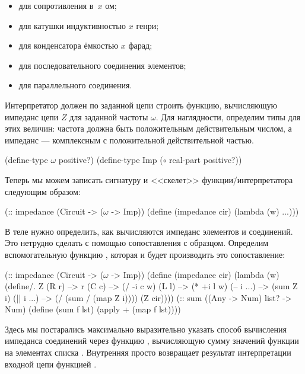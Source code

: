 \begin{itemize}
 \item[]  для сопротивления в~$x$ ом;

 \item[]  для катушки индуктивностью $x$ генри;

 \item[]  для конденсатора ёмкостью $x$ фарад;

 \item[]  для последовательного соединения элементов;

 \item[]  для параллельного соединения.
\end{itemize}

 Интерпретатор должен по заданной цепи строить функцию, вычисляющую импеданс цепи $Z$ для заданной частоты $\omega$. 
Для наглядности, определим типы для этих величин: частота должна быть положительным действительным числом, а импеданс --- комплексным с положительной действительной частью.
\begin{Definition}
 (define-type $\omega$ positive?)
 (define-type Imp ($\circ$ real-part positive?))
\end{Definition}
Теперь мы можем записать сигнатуру и <<скелет>> функции\=/интерпретатора  следующим образом:
\label{example:impedance}%
\begin{SchemeCode}[emph={cir,w}]
(:: impedance (Circuit -> ($\omega$ -> Imp))
 (define (impedance cir)
   (lambda (w) ...)))
\end{SchemeCode}

В теле  нужно определить, как вычисляются импеданс элементов и соединений. Это нетрудно сделать с помощью сопоставления с образцом. Определим вспомогательную функцию , которая и будет производить это сопоставление:
\newpage
\begin{Definition}[emph={cir,w,f,lst,r,c,l,i}]
(:: impedance (Circuit -> ($\omega$ -> Imp))
 (define (impedance cir)
   (lambda (w) 
     (define/. Z
       (R r) --> r
       (C c) --> (/ -i c w)
       (L l) --> (* +i l w)
       (-- i ...) --> (sum Z i)
       (|| i ...) --> (/ (sum / (map Z i))))
     (Z cir))))%
(:: sum ((Any -> Num) list? -> Num)
  (define (sum f lst) 
    (apply + (map f lst))))
\end{Definition}
Здесь мы постарались максимально выразительно указать способ вычисления импеданса соединений через функцию , вычисляющую сумму значений функции  на элементах списка . Внутренняя   просто возвращает результат интерпретации входной цепи  функцией .


